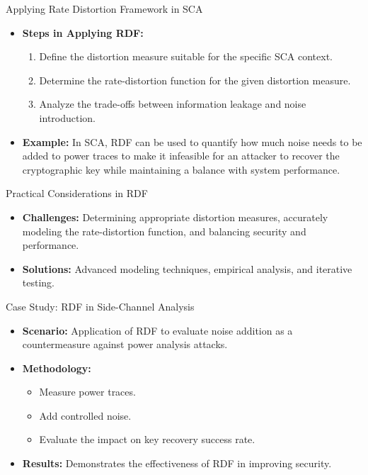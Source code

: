 \documentclass{beamer}
\begin{document}
\begin{frame}{Applying Rate Distortion Framework in SCA}
    \begin{itemize}
        \item \textbf{Steps in Applying RDF:}
        \begin{enumerate}
            \item Define the distortion measure suitable for the specific SCA context.
            \item Determine the rate-distortion function for the given distortion measure.
            \item Analyze the trade-offs between information leakage and noise introduction.
        \end{enumerate}
        \item \textbf{Example:} In SCA, RDF can be used to quantify how much noise needs to be added to power traces to make it infeasible for an attacker to recover the cryptographic key while maintaining a balance with system performance.
    \end{itemize}
\end{frame}

\begin{frame}{Practical Considerations in RDF}
    \begin{itemize}
        \item \textbf{Challenges:} Determining appropriate distortion measures, accurately modeling the rate-distortion function, and balancing security and performance.
        \item \textbf{Solutions:} Advanced modeling techniques, empirical analysis, and iterative testing.
    \end{itemize}
\end{frame}

\begin{frame}{Case Study: RDF in Side-Channel Analysis}
    \begin{itemize}
        \item \textbf{Scenario:} Application of RDF to evaluate noise addition as a countermeasure against power analysis attacks.
        \item \textbf{Methodology:} 
        \begin{itemize}
            \item Measure power traces.
            \item Add controlled noise.
            \item Evaluate the impact on key recovery success rate.
        \end{itemize}
        \item \textbf{Results:} Demonstrates the effectiveness of RDF in improving security.
    \end{itemize}
\end{frame}
\end{document}
